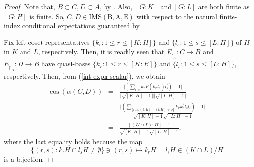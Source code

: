 \documentclass[a4]{amsart}
\numberwithin{equation}{section}
\begin{document}
    \begin{proof}
      Note that, $B \subset C, D \subset A$, by
      . Also, $[G:K]$ and $[G:L]$ are both finite as
      $[G:H]$ is finite. So, $C, D \in \mathrm{IMS(B,A,E)}$ with
      respect to the natural finite-index conditional expectations
      guaranteed by .
     
      Fix left coset representatives $\{k_r: 1 \leq r \leq [K:H]\}$
      and $\{ {l_s} : 1 \leq s \leq [L:H]\}$ of $H$ in $K$ and $L$,
      respectively.  Then, it is readily seen that $E_{\restriction_C}
      : C \to B$ and $E_{\restriction_D} : D \to B$ have quasi-bases
      $\{ {k_r} : 1\leq r \leq [K:H]\}$ and $\{ {l_s} : 1 \leq s
      \leq [L:H]\}$, respectively.  Then,  from  (\ref{int-expn-scalar}), we obtain 
\begin{eqnarray*}
	\cos(\alpha(C,D)) &=& \frac { \Vert (\sum_{r,s} k_r E(k_{r}^*
          l_s)l_{s}^*)-1 \Vert}{ \Vert \sqrt{[K:H]-1}\Vert
          \Vert\sqrt{[L:H] - 1} \Vert} \\ & = & \frac {\Vert
          \left(\sum_{\{r,s : (k_rH)\cap (l_sH) \ne \phi\}} k_r
          k_{r}^* l_s l_{s}^* \right) - 1 \Vert} { \sqrt{[K:H]-1}
          \sqrt{[L:H] - 1}} \\ & = & \frac{[(K \cap L):H] -1
        }{\sqrt{[K:H]-1} \sqrt{[L:H] - 1}},
\end{eqnarray*}
where the last equality holds  because the map 
\[
\{(r,s) : k_rH\cap l_sH \neq \emptyset\} \ni (r,s) \mapsto k_rH = l_sH \in (K\cap L)/H
\]
is a bijection.
    \end{proof}
\end{document}
